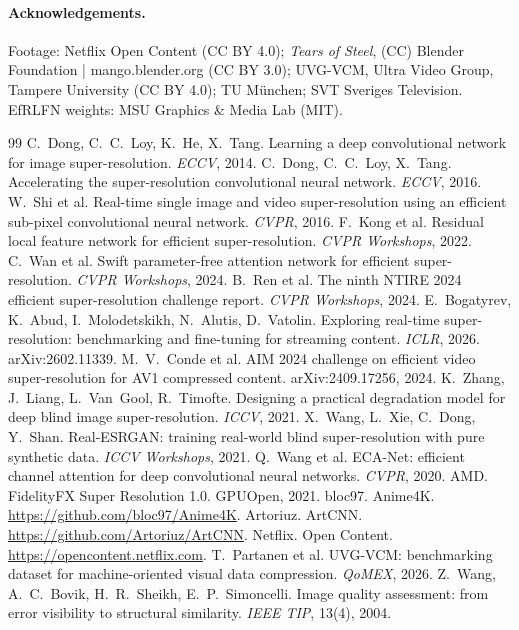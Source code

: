 \documentclass[10pt,twocolumn,letterpaper]{article}
\begin{document}
\paragraph{Acknowledgements.} Footage: Netflix Open Content (CC BY 4.0); \emph{Tears of Steel}, (CC)
Blender Foundation | mango.blender.org (CC BY 3.0); UVG-VCM, Ultra Video Group, Tampere University
(CC BY 4.0); TU München; SVT Sveriges Television. EfRLFN weights: MSU Graphics \& Media Lab (MIT).

\small
\begin{thebibliography}{99}
 C.~Dong, C.~C.~Loy, K.~He, X.~Tang. Learning a deep convolutional network for
image super-resolution. \emph{ECCV}, 2014.
 C.~Dong, C.~C.~Loy, X.~Tang. Accelerating the super-resolution convolutional
neural network. \emph{ECCV}, 2016.
 W.~Shi et al. Real-time single image and video super-resolution using an efficient
sub-pixel convolutional neural network. \emph{CVPR}, 2016.
 F.~Kong et al. Residual local feature network for efficient super-resolution.
\emph{CVPR Workshops}, 2022.
 C.~Wan et al. Swift parameter-free attention network for efficient
super-resolution. \emph{CVPR Workshops}, 2024.
 B.~Ren et al. The ninth NTIRE 2024 efficient super-resolution challenge report.
\emph{CVPR Workshops}, 2024.
 E.~Bogatyrev, K.~Abud, I.~Molodetskikh, N.~Alutis, D.~Vatolin. Exploring
real-time super-resolution: benchmarking and fine-tuning for streaming content. \emph{ICLR}, 2026.
arXiv:2602.11339.
 M.~V.~Conde et al. AIM 2024 challenge on efficient video super-resolution for
AV1 compressed content. arXiv:2409.17256, 2024.
 K.~Zhang, J.~Liang, L.~Van~Gool, R.~Timofte. Designing a practical degradation
model for deep blind image super-resolution. \emph{ICCV}, 2021.
 X.~Wang, L.~Xie, C.~Dong, Y.~Shan. Real-ESRGAN: training real-world blind
super-resolution with pure synthetic data. \emph{ICCV Workshops}, 2021.
 Q.~Wang et al. ECA-Net: efficient channel attention for deep convolutional neural
networks. \emph{CVPR}, 2020.
 AMD. FidelityFX Super Resolution 1.0. GPUOpen, 2021.
 bloc97. Anime4K. \url{https://github.com/bloc97/Anime4K}.
 Artoriuz. ArtCNN. \url{https://github.com/Artoriuz/ArtCNN}.
 Netflix. Open Content. \url{https://opencontent.netflix.com}.
 T.~Partanen et al. UVG-VCM: benchmarking dataset for machine-oriented visual data
compression. \emph{QoMEX}, 2026.
 Z.~Wang, A.~C.~Bovik, H.~R.~Sheikh, E.~P.~Simoncelli. Image quality assessment:
from error visibility to structural similarity. \emph{IEEE TIP}, 13(4), 2004.
\end{thebibliography}
\end{document}
